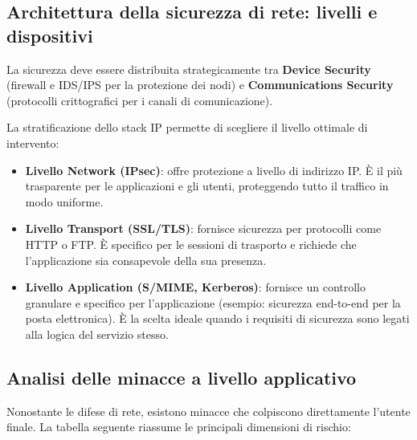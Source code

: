\subsection{Architettura della sicurezza di rete: livelli e dispositivi}

La sicurezza deve essere distribuita strategicamente tra \textbf{Device Security}
(firewall e IDS/IPS per la protezione dei nodi) e \textbf{Communications Security}
(protocolli crittografici per i canali di comunicazione).

La stratificazione dello stack IP permette di scegliere il livello ottimale di
intervento:

\begin{itemize}
\item \textbf{Livello Network (IPsec)}: offre protezione a livello di indirizzo IP.
È il più trasparente per le applicazioni e gli utenti, proteggendo tutto il
traffico in modo uniforme.
\item \textbf{Livello Transport (SSL/TLS)}: fornisce sicurezza per protocolli come
HTTP o FTP. È specifico per le sessioni di trasporto e richiede che l'applicazione
sia consapevole della sua presenza.
\item \textbf{Livello Application (S/MIME, Kerberos)}: fornisce un controllo
granulare e specifico per l'applicazione (esempio: sicurezza end-to-end per la
posta elettronica). È la scelta ideale quando i requisiti di sicurezza sono legati
alla logica del servizio stesso.
\end{itemize}

\subsection{Analisi delle minacce a livello applicativo}

Nonostante le difese di rete, esistono minacce che colpiscono direttamente
l'utente finale. La tabella seguente riassume le principali dimensioni di rischio:

